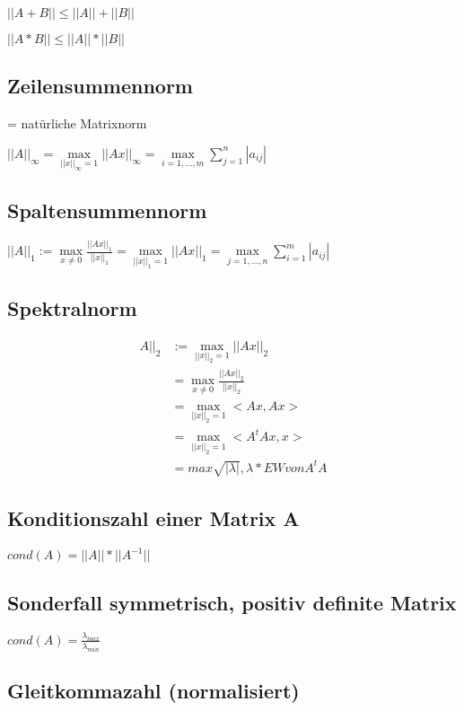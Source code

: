 \documentclass[12pt,a4paper]{article} %
\begin{document}
	$||A+B|| \le ||A|| + ||B||$
	
	$||A*B|| \le ||A|| * ||B||$
	
	\subsection{Zeilensummennorm}
	= natürliche Matrixnorm
	
	$||A||_\infty = \max\limits_{||x||_\infty = 1} ||Ax||_\infty = \max\limits_{i = 1, ..., m} \sum\limits_{j = 1}^{n} |a_{ij}|$
	
	\subsection{Spaltensummennorm}
	
	$||A||_1 := \max\limits_{x \ne 0} \frac{||Ax||_1}{||x||_1} = \max\limits_{||x||_1 = 1} ||Ax||_1 = \max\limits_{j = 1, ..., n} \sum\limits_{i = 1}^{m}|a_{ij}|$
	
	\subsection{Spektralnorm}
	
	\begin{equation*}
	\begin{split}
	A||_2 &:= \max\limits_{||x||_2 = 1} ||Ax||_2 \\
	&= \max\limits_{x \ne 0} \frac{||Ax||_2}{||x||_2} \\
	&= \max\limits_{||x||_2 = 1} <Ax, Ax> \\
	&= \max\limits_{||x||_2 = 1} <A^tAx, x> \\
	&= max{\sqrt{|\lambda |}, \lambda * EW von A^tA}
	\end{split}
	\end{equation*}
	
	\subsection{Konditionszahl einer Matrix A}
	
	$cond(A) = ||A||*||A^{-1}||$
	
	\subsection{Sonderfall symmetrisch, positiv definite Matrix}
	
	$cond(A) = \frac{ \lambda_{max}}{ \lambda_{min}}$
	
	\subsection{Gleitkommazahl (normalisiert)}
	
\end{document}
